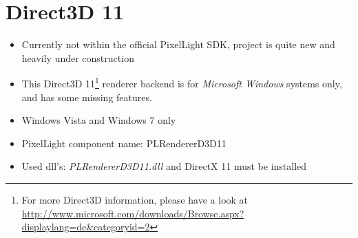 \section{Direct3D 11}
\begin{itemize}
\item Currently not within the official PixelLight SDK, project is quite new and heavily under construction
\item This Direct3D 11\footnote{For more Direct3D information, please have a look at \url{http://www.microsoft.com/downloads/Browse.aspx?displaylang=de&categoryid=2}} renderer backend is for \emph{Microsoft Windows} systems only, and has some missing features.
\item Windows Vista and Windows 7 only
\item PixelLight component name: PLRendererD3D11
\item Used dll's: \emph{PLRendererD3D11.dll} and DirectX 11 must be installed
\end{itemize}
